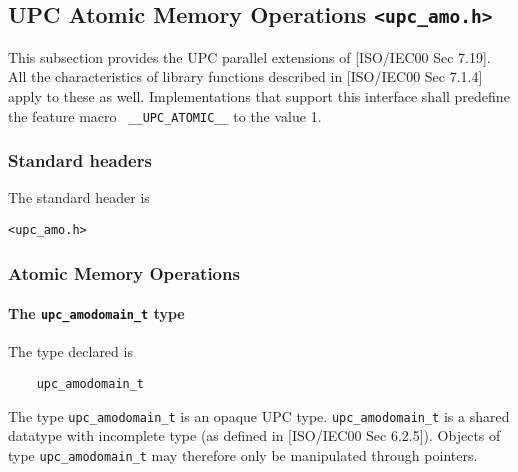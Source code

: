\subsection{UPC Atomic Memory Operations {\tt <upc\_amo.h>}}

\newcommand{\hl}[1]{\colorbox{yellow}{#1}}

\npf This subsection provides the UPC parallel extensions of [ISO/IEC00 
    Sec 7.19].  All the characteristics of library functions described
    in [ISO/IEC00 Sec 7.1.4] apply to these as well.  Implementations
    that support this interface shall predefine the feature macro {\tt
    \_\_UPC\_ATOMIC\_\_} to the value 1.


\subsubsection{Standard headers}

\np The standard header is

{\tt <upc\_amo.h>}

\subsubsection{Atomic Memory Operations}

\paragraph{The {\tt upc\_amodomain\_t} type}

\npf The type declared is
\begin{verbatim}
    upc_amodomain_t
\end{verbatim}

\np The type {\tt upc\_amodomain\_t} is an opaque UPC type.
    {\tt upc\_amodomain\_t} is a shared datatype with incomplete type (as 
    defined in [ISO/IEC00 Sec 6.2.5]).  Objects of type {\tt upc\_amodomain\_t}
    may therefore only be manipulated through pointers.

